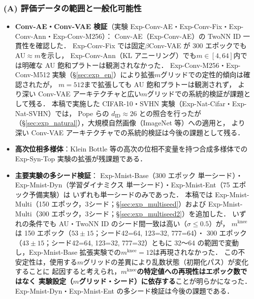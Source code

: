 \documentclass[11pt,a4paper]{jsarticle}
\newcommand{\mknee}{m^{\mathrm{knee}}}
\begin{document}
\subsubsection*{(A) 評価データの範囲と一般化可能性}

\begin{itemize}
  \item \textbf{Conv-AE・Conv-VAE 検証}（実験 Exp-Conv-AE・Exp-Conv-Fix・Exp-Conv-Ann・Exp-Conv-M256）：
        Conv-AE（Exp-Conv-AE）の TwoNN ID 一貫性を確認した．
        Exp-Conv-Fix では固定$\beta$Conv-VAE が 300 エポックでも AU$\approx m$を示し，
        Exp-Conv-Ann（KL アニーリング）でも$m\in[4,64]$内では明確な AU 飽和プラトーは観測されなかった．
        Exp-Conv-M256・Exp-Conv-M512 実験（§\ref{sec:exp_en}）により拡張$m$グリッドでの定性的傾向は確認されたが，
        $m=512$まで拡張しても AU 飽和プラトーは観測されず，
        より深い Conv-VAE アーキテクチャと広い$m$グリッドでの系統的検証が課題として残る．
        本稿で実施した CIFAR-10・SVHN 実験（Exp-Nat-Cifar・Exp-Nat-SVHN）では，
        Pope ら\cite{pope2021intrinsic}の $d_\mathrm{ID} \approx 26$ との照合を行ったが
        （§\ref{sec:exp_natural}），大規模自然画像（ImageNet 等）への適用と，
        より深い Conv-VAE アーキテクチャでの系統的検証は今後の課題として残る．
  \item \textbf{高次位相多様体}：Klein Bottle 等の高次の位相不変量を持つ合成多様体での
        Exp-Syn-Top 実験の拡張が残課題である．
  \item \textbf{主要実験の多シード検証}：
        Exp-Mnist-Base（300 エポック 単一シード）・Exp-Mnist-Dyn（学習ダイナミクス 単一シード）・Exp-Mnist-Ent（75 エポック予備実験）は
        いずれも単一シードのみであった．
        本稿では Exp-Mnist-Multi（150 エポック，3シード；§\ref{sec:exp_multiseed}）および
        Exp-Mnist-Multi（300 エポック，3シード；§\ref{sec:exp_multiseed2}）を追加した．
        いずれの条件でも AU・TwoNN ID のシード間一致は高い（$\sigma \leq 0.5$）が，
        $\mknee$は 150 エポック（$53 \pm 15$；シード42=64, 123=32, 777=64）・
        300 エポック（$43 \pm 15$；シード42=64, 123=32, 777=32）ともに
        32〜64 の範囲で変動し，Exp-Mnist-Base 拡張実験での$\mknee = 12$は再現されなかった．
        この不安定性は，使用する$m$グリッドの差異により乱数状態（初期化パス）が変化することに
        起因すると考えられ，\textbf{$\mknee$の特定値への再現性はエポック数ではなく
        実験設定（$m$グリッド・シード）に依存する}ことが明らかになった．
        Exp-Mnist-Dyn・Exp-Mnist-Ent の多シード検証は今後の課題である．
\end{itemize}
\end{document}
